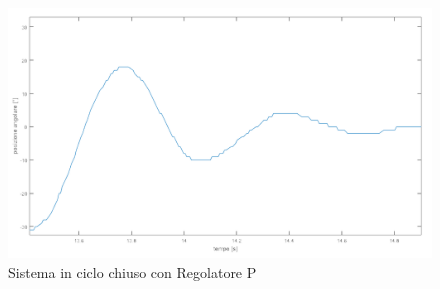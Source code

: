 \begin{figure}[ht]
	\centering
	\includegraphics[scale=0.4]{oscillCL.PNG}
	\caption{Sistema in ciclo chiuso con Regolatore P}
	\label{oscillCL}
\end{figure}
